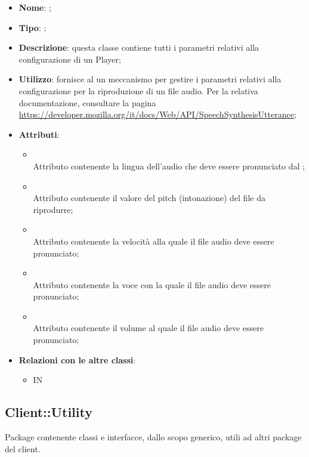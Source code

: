 \begin{itemize}
	\item \textbf{Nome}: ;
	\item \textbf{Tipo}: ;
	\item \textbf{Descrizione}: questa classe contiene tutti i parametri relativi alla configurazione di un Player;
	\item \textbf{Utilizzo}: fornisce al  un meccanismo per gestire i parametri relativi alla configurazione per la riproduzione di un file audio.
Per la relativa documentazione, consultare la pagina \url{https://developer.mozilla.org/it/docs/Web/API/SpeechSynthesisUtterance};
	\item \textbf{Attributi}:
	\begin{itemize}
		\item[]  \\
		Attributo contenente la lingua dell'audio che deve essere pronunciato dal ;
		\item[]  \\
		Attributo contenente il valore del pitch (intonazione) del file da riprodurre;
		\item[]  \\
		Attributo contenente la velocità alla quale il file audio deve essere pronunciato;
		\item[]  \\
		Attributo contenente la voce con la quale il file audio deve essere pronunciato;
		\item[]  \\
		Attributo contenente il volume al quale il file audio deve essere pronunciato;
	\end{itemize}
	\item \textbf{Relazioni con le altre classi}:
	\begin{itemize}
		\item IN \hyperlink{Player_label}{}
	\end{itemize}
\end{itemize}
\FloatBarrier

\subsection{Client::Utility}
Package contenente classi e interfacce, dallo scopo generico, utili ad altri package del client.
